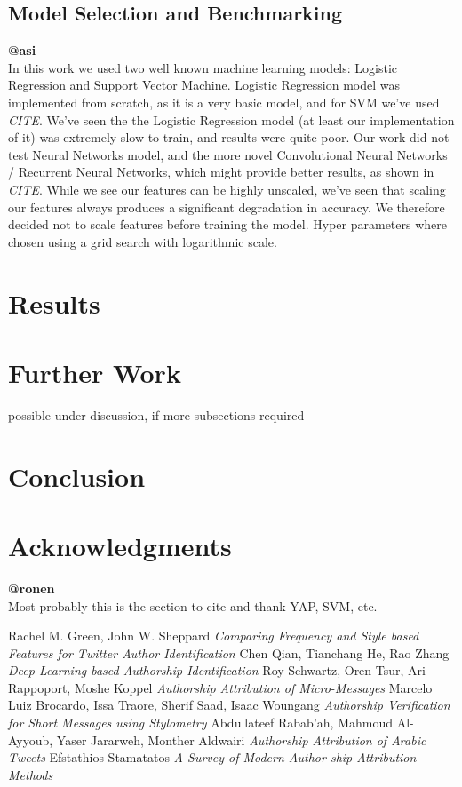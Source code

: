 \documentclass[a4paper]{article}
\begin{document}
\subsection{Model Selection and Benchmarking}
\textbf{@asi}\\
In this work we used two well known machine learning models: Logistic Regression and Support Vector Machine.
Logistic Regression model was implemented from scratch, as it is a very basic model, and for SVM we've used \emph{CITE}.
We've seen the the Logistic Regression model (at least our implementation of it) was extremely slow to train, and results were quite poor.
Our work did not test Neural Networks model, and the more novel Convolutional Neural Networks / Recurrent Neural Networks, which might provide better results, as shown in \emph{CITE}.
While we see our features can be highly unscaled, we've seen that scaling our features always produces a significant degradation in accuracy.
We therefore decided not to scale features before training the model.
Hyper parameters where chosen using a grid search with logarithmic scale.
\section{Results}
\label{Results}
\section{Further Work}
\label{Further Work}
possible under discussion, if more subsections required
\section{Conclusion}
\label{Conclusion}
\section{Acknowledgments}
\label{Acknowledgments}
\textbf{@ronen}\\
Most probably this is the section to cite and thank YAP, SVM, etc.


\begin{thebibliography}{9}

	Rachel M. Green, John W. Sheppard
	\textit{Comparing Frequency and Style based Features for Twitter Author Identification}
	Chen Qian, Tianchang He, Rao Zhang
	\textit{Deep Learning based Authorship Identification}
	Roy Schwartz, Oren Tsur, Ari Rappoport, Moshe Koppel
	\textit{Authorship Attribution of Micro-Messages}
	Marcelo Luiz Brocardo, Issa Traore, Sherif Saad, Isaac Woungang
	\textit{Authorship Verification for Short Messages using Stylometry}
	Abdullateef Rabab’ah, Mahmoud Al-Ayyoub, Yaser Jararweh, Monther Aldwairi
	\textit{Authorship Attribution of Arabic Tweets}
	Efstathios Stamatatos
	\textit{A Survey of Modern Author ship Attribution Methods}
	
\end{thebibliography}
\end{document}
